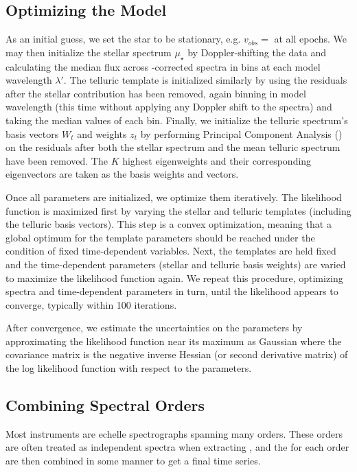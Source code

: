 \documentclass[modern]{aastex62}
\begin{document}
\subsection{Optimizing the Model}
\label{s:optimizing}

As an initial guess, we set the star to be stationary, e.g. $v_{obs} = $ \BERV at all epochs.
We may then initialize the stellar spectrum $\mu_{\star}$ by Doppler-shifting the data and calculating the median flux across \BERV-corrected spectra in bins at each model wavelength $\lambda'$.
The telluric template is initialized similarly by using the residuals after the stellar contribution has been removed, again binning in model wavelength (this time without applying any Doppler shift to the spectra) and taking the median values of each bin.
Finally, we initialize the telluric spectrum's basis vectors $W_t$ and weights $z_t$ by performing Principal Component Analysis () on the residuals after both the stellar spectrum and the mean telluric spectrum have been removed.
The $K$ highest eigenweights and their corresponding eigenvectors are taken as the basis weights and vectors.

Once all parameters are initialized, we optimize them iteratively.
The likelihood function is maximized first by varying the stellar and telluric templates (including the telluric basis vectors).
This step is a convex optimization, meaning that a global optimum for the template parameters should be reached under the condition of fixed time-dependent variables.
Next, the templates are held fixed and the time-dependent parameters (stellar \RVs and telluric basis weights) are varied to maximize the likelihood function again.
We repeat this procedure, optimizing spectra and time-dependent parameters in turn, until the likelihood appears to converge, typically within 100 iterations.

After convergence, we estimate the uncertainties on the parameters by
approximating the likelihood function near its maximum as Gaussian where the
covariance matrix is the negative inverse Hessian (or second derivative
matrix) of the log likelihood function with respect to the parameters.

\subsection{Combining Spectral Orders}
\label{s:combining-orders}

Most \EPRV instruments are echelle spectrographs spanning many orders.
These orders are often treated as independent spectra when extracting \RVs, and the \RVs for each order are then combined in some manner to get a final time series.
\end{document}

